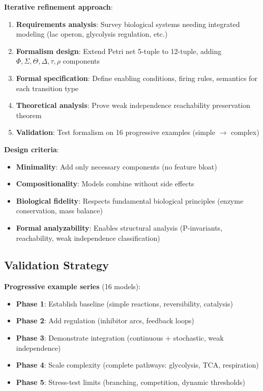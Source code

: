 \textbf{Iterative refinement approach}:

\begin{enumerate}
    \item \textbf{Requirements analysis}: Survey biological systems needing integrated modeling (lac operon, glycolysis regulation, etc.)
    \item \textbf{Formalism design}: Extend Petri net 5-tuple to 12-tuple, adding $\Phi, \Sigma, \Theta, \Delta, \tau, \rho$ components
    \item \textbf{Formal specification}: Define enabling conditions, firing rules, semantics for each transition type
    \item \textbf{Theoretical analysis}: Prove weak independence reachability preservation theorem
    \item \textbf{Validation}: Test formalism on 16 progressive examples (simple $\to$ complex)
\end{enumerate}

\textbf{Design criteria}:

\begin{itemize}
    \item \textbf{Minimality}: Add only necessary components (no feature bloat)
    \item \textbf{Compositionality}: Models combine without side effects
    \item \textbf{Biological fidelity}: Respects fundamental biological principles (enzyme conservation, mass balance)
    \item \textbf{Formal analyzability}: Enables structural analysis (P-invariants, reachability, weak independence classification)
\end{itemize}

\subsection{Validation Strategy}
\label{subsec:validation-strategy}

\textbf{Progressive example series} (16 models):

\begin{itemize}
    \item \textbf{Phase 1}: Establish baseline (simple reactions, reversibility, catalysis)
    \item \textbf{Phase 2}: Add regulation (inhibitor arcs, feedback loops)
    \item \textbf{Phase 3}: Demonstrate integration (continuous + stochastic, weak independence)
    \item \textbf{Phase 4}: Scale complexity (complete pathways: glycolysis, TCA, respiration)
    \item \textbf{Phase 5}: Stress-test limits (branching, competition, dynamic thresholds)
\end{itemize}

